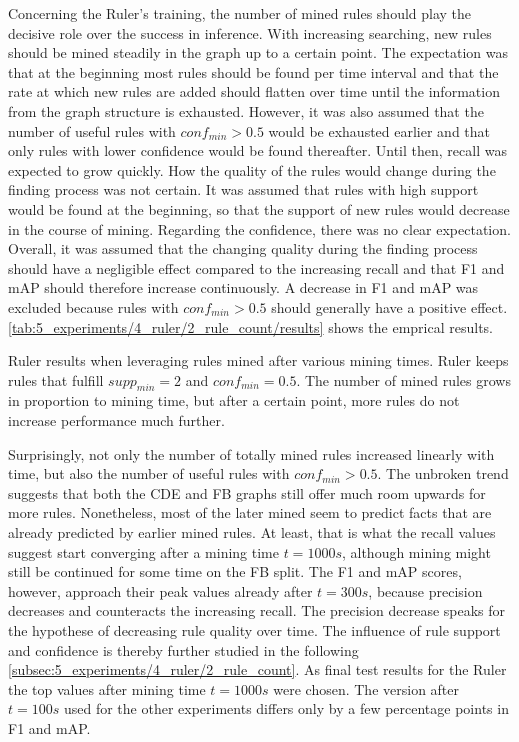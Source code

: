 Concerning the Ruler's training, the number of mined rules should play the decisive role over the success in inference. With increasing searching, new rules should be mined steadily in the graph up to a certain point. The expectation was that at the beginning most rules should be found per time interval and that the rate at which new rules are added should flatten over time until the information from the graph structure is exhausted. However, it was also assumed that the number of useful rules with $conf_{min} > 0.5$ would be exhausted earlier and that only rules with lower confidence would be found thereafter. Until then, recall was expected to grow quickly. How the quality of the rules would change during the finding process was not certain. It was assumed that rules with high support would be found at the beginning, so that the support of new rules would decrease in the course of mining. Regarding the confidence, there was no clear expectation. Overall, it was assumed that the changing quality during the finding process should have a negligible effect compared to the increasing recall and that F1 and mAP should therefore increase continuously. A decrease in F1 and mAP was excluded because rules with $conf_{min} > 0.5$ should generally have a positive effect. \autoref{tab:5_experiments/4_ruler/2_rule_count/results} shows the emprical results.

\begin{table}
    \makebox[\textwidth][c]{
        
    }
    \caption{Ruler results when leveraging rules mined after various mining times. Ruler keeps rules that fulfill $supp_{min} = 2$ and $conf_{min} = 0.5$. The number of mined rules grows in proportion to mining time, but after a certain point, more rules do not increase performance much further.}
    \label{tab:5_experiments/4_ruler/2_rule_count/results}
\end{table}

Surprisingly, not only the number of totally mined rules increased linearly with time, but also the number of useful rules with $conf_{min} > 0.5$. The unbroken trend suggests that both the CDE and FB graphs still offer much room upwards for more rules. Nonetheless, most of the later mined seem to predict facts that are already predicted by earlier mined rules. At least, that is what the recall values suggest start converging after a mining time $t = 1000s$, although mining might still be continued for some time on the FB split. The F1 and mAP scores, however, approach their peak values already after $t = 300s$, because precision decreases and counteracts the increasing recall. The precision decrease speaks for the hypothese of decreasing rule quality over time. The influence of rule support and confidence is thereby further studied in the following \autoref{subsec:5_experiments/4_ruler/2_rule_count}. As final test results for the Ruler the top values after mining time $t = 1000s$ were chosen. The version after $t = 100s$ used for the other experiments differs only by a few percentage points in F1 and mAP.
